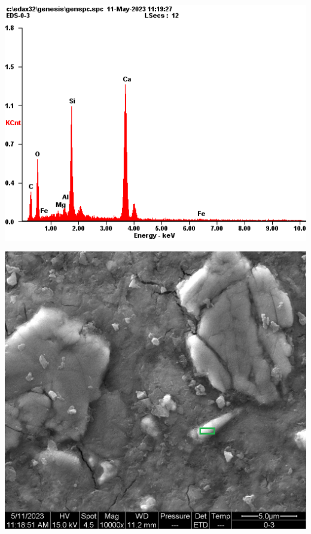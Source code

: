 \begin{minipage}{\textwidth}
  \begin{minipage}[b]{0.32\textwidth}
    \centering
    \includegraphics[width = \linewidth]{assets/spectrum/00-03-15000x-ETD-C2S.png}
  \end{minipage}
  \hfill
  \begin{minipage}[b]{0.32\textwidth}
    \centering
    \includegraphics[width = \linewidth]{assets/spectrum selection/00-03-10000x-ETD-C2S.png}

\end{minipage}
\end{minipage}
